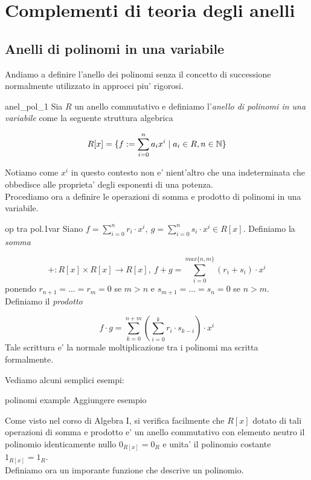 \section{Complementi di teoria degli anelli}

\subsection{Anelli di polinomi in una variabile}

Andiamo a definire l'anello dei polinomi senza il concetto di successione normalmente 
utilizzato in approcci piu' rigorosi.


\begin{defn}{anel_pol_1}
Sia $R$ un anello commutativo e definiamo l'\emph{anello di polinomi in una variabile}
come la seguente struttura algebrica

\begin{equation}
R[x] = \{ f:= \sum\limits_{i=0}^{n}a_i x^i \mid a_i \in R, n\in \mathbb{N}\} 
\end{equation}
\end{defn}
Notiamo come $x^i$ in questo contesto non e' nient'altro che una indeterminata che
obbedisce alle proprieta' degli esponenti di una potenza. \\
Procediamo ora a definire le operazioni di somma e prodotto di polinomi in una variabile.

\begin{defn}{op tra pol.1var}
Siano $f = \sum_{i=0}^{n}r_i \cdot x^i,\ g = \sum_{i=0}^{n}s_i \cdot x^i \in R[x]$. 
Definiamo la \emph{somma}

\begin{equation}
+ : R[x] \times R[x] \to R[x],\ f + g = \sum\limits_{i=0}^{max\{n,m\}} (r_i + s_i) \cdot x^i
\end{equation}
ponendo $r_{n+1} = \dots = r_m = 0$ se $m > n$ e $s_{m+1} = \dots = s_n = 0$ se $n > m$.\\
Definiamo il \emph{prodotto}

\begin{equation}
f\cdot g = \sum\limits_{k=0}^{n+m} (\sum\limits_{i=0}^{k} r_i \cdot s_{k-i}) \cdot x^i
\end{equation}
Tale scrittura e' la normale moltiplicazione tra i polinomi ma scritta formalmente.
\end{defn}
Vediamo alcuni semplici esempi: 

\begin{example}[]{polinomi example}
Aggiungere esempio
\end{example}
Come visto nel corso di Algebra I, si verifica facilmente che $R[x]$ dotato di 
tali operazioni di somma e prodotto e' un anello commutativo con elemento neutro il polinomio
identicamente nullo $0_{R[x]} = 0_R$ e unita' il polinomio costante $1_{R[x]} = 1_R$.\\
Definiamo ora un imporante funzione che descrive un polinomio.

